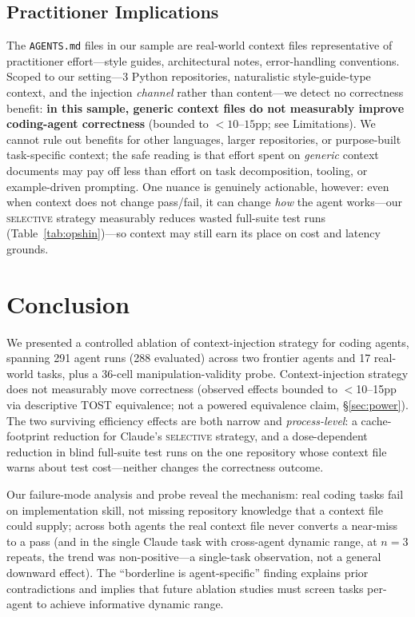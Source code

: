 \documentclass[11pt]{article}
\newcommand{\agentsmd}{\texttt{AGENTS.md}}
\newcommand{\selective}{\textsc{selective}}
\begin{document}
\subsection{Practitioner Implications}

The \agentsmd{} files in our sample are real-world context files representative of practitioner effort---style guides, architectural notes, error-handling conventions.
Scoped to our setting---3 Python repositories, naturalistic style-guide-type context, and the injection \emph{channel} rather than content---we detect no correctness benefit: \textbf{in this sample, generic context files do not measurably improve coding-agent correctness} (bounded to ${<}10$--$15$pp; see Limitations).
We cannot rule out benefits for other languages, larger repositories, or purpose-built task-specific context; the safe reading is that effort spent on \emph{generic} context documents may pay off less than effort on task decomposition, tooling, or example-driven prompting.
One nuance is genuinely actionable, however: even when context does not change pass/fail, it can change \emph{how} the agent works---our \selective{} strategy measurably reduces wasted full-suite test runs (Table~\ref{tab:opshin})---so context may still earn its place on cost and latency grounds.

\section{Conclusion}

We presented a controlled ablation of context-injection strategy for coding agents, spanning 291 agent runs (288 evaluated) across two frontier agents and 17 real-world tasks, plus a 36-cell manipulation-validity probe.
Context-injection strategy does not measurably move correctness (observed effects bounded to $<$10--15pp via descriptive TOST equivalence; not a powered equivalence claim, \S\ref{sec:power}).
The two surviving efficiency effects are both narrow and \emph{process-level}: a cache-footprint reduction for Claude's \selective{} strategy, and a dose-dependent reduction in blind full-suite test runs on the one repository whose context file warns about test cost---neither changes the correctness outcome.

Our failure-mode analysis and probe reveal the mechanism: real coding tasks fail on implementation skill, not missing repository knowledge that a context file could supply; across both agents the real context file never converts a near-miss to a pass (and in the single Claude task with cross-agent dynamic range, at $n{=}3$ repeats, the trend was non-positive---a single-task observation, not a general downward effect).
The ``borderline is agent-specific'' finding explains prior contradictions and implies that future ablation studies must screen tasks per-agent to achieve informative dynamic range.
\end{document}
